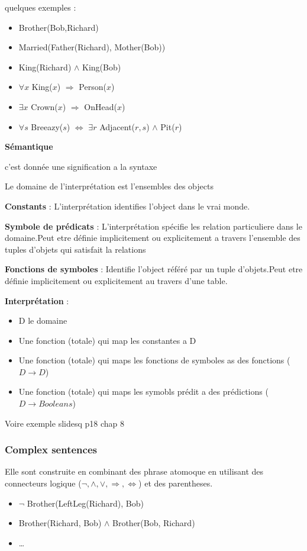 		quelques exemples :
		\begin{itemize}
			\item Brother(Bob,Richard)
			\item Married(Father(Richard), Mother(Bob))
			\item King(Richard) $\land$ King(Bob)
			\item $\forall x$ King($x$) $\Rightarrow$ Person($x$)
			\item $\exists x$ Crown($x$) $\Rightarrow$ OnHead($x$)
			\item $\forall s$ Breeazy($s$) $\Leftrightarrow$ $\exists r$ Adjacent($r,s$) $\land$ Pit($r$) 
		\end{itemize}
		
		\textbf{Sémantique}
		
			c'est donnée une signification a la syntaxe
		
			Le domaine de l'interprétation est l'ensembles des objects
			
			\textbf{Constants} : L'interprétation identifies l'object dans le vrai monde.
			
			\textbf{Symbole de prédicats} : L'interprétation spécifie les relation particuliere dans le domaine.Peut etre définie implicitement ou explicitement a travers l'ensemble des tuples d'objets qui satisfait la relations
			
			
			\textbf{Fonctions de symboles} : Identifie l'object référé par un tuple d'objets.Peut etre définie implicitement ou explicitement au travers d'une table.
			
		
		\textbf{Interprétation} : 
		\begin{itemize}
			\item D le domaine
			\item Une fonction (totale) qui map les constantes a D
			\item Une fonction (totale) qui maps les fonctions de symboles as des fonctions ($D \rightarrow D$)
			\item Une fonction (totale) qui maps les symobls prédit a des prédictions ($D \rightarrow Booleans$)
		\end{itemize}
		
		Voire exemple slidesq p18 chap 8
		
		\subsubsection{Complex sentences}
			Elle sont construite en combinant des phrase atomoque en utilisant des connecteurs logique ($\neg, \land, \lor, \Rightarrow, \Leftrightarrow$) et des parentheses.
			\begin{itemize}
				\item $ \neg$ Brother(LeftLeg(Richard), Bob)
				\item Brother(Richard, Bob) $\land$ Brother(Bob, Richard)
				\item \dots
			\end{itemize}
			
